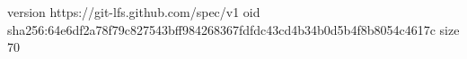 version https://git-lfs.github.com/spec/v1
oid sha256:64e6df2a78f79c827543bff984268367fdfdc43cd4b34b0d5b4f8b8054c4617c
size 70
